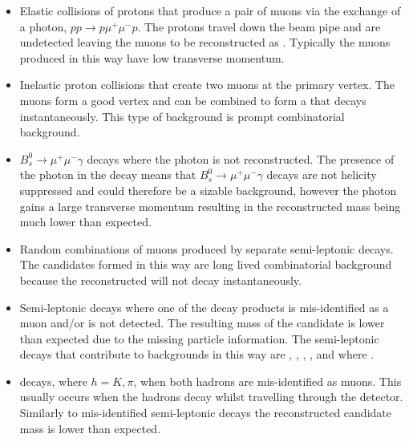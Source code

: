 \begin{itemize}
\item Elastic collisions of protons that produce a pair of muons via the exchange of a photon, $pp \to p \mu^{+} \mu^{-} p$. The protons travel down the beam pipe and are undetected leaving the muons to be reconstructed as \bmumu. Typically the muons produced in this way have low transverse momentum. %
\item Inelastic proton collisions that create two muons at the primary vertex. The muons form a good vertex and can be combined to form a \bsd that decays instantaneously. This type of background is prompt combinatorial background. 
\item $B_{s}^{0}\to\mu^{+}\mu^{-}\gamma$ decays where the photon is not reconstructed. The presence of the photon in the decay means that $B_{s}^{0}\to\mu^{+}\mu^{-}\gamma$ decays are not helicity suppressed and could therefore be a sizable background, however the photon gains a large transverse momentum resulting in the reconstructed \bsd mass being much lower than expected.
\item Random combinations of muons produced by separate semi-leptonic decays. The \bmumu candidates formed in this way are long lived combinatorial background because the reconstructed \bsd will not decay instantaneously. %
\item Semi-leptonic decays where one of the decay products is mis-identified as a muon and/or is not detected. The resulting mass of the \bsd candidate is lower than expected due to the missing particle information. The semi-leptonic decays that contribute to \bmumu backgrounds in this way are \bdpimunu, \bsKmunu, \lambdab, \bupimumu, \bdpimumu and \bcjpsimunu where \jpsimumu. %
\item \bhh decays, where $ h  = K, \pi$, when both hadrons are mis-identified as muons. This usually occurs when the hadrons decay whilst travelling through the detector. Similarly to mis-identified semi-leptonic decays the reconstructed \bsd candidate mass is lower than expected. %
\end{itemize}

